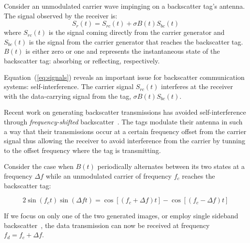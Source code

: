 
Consider an unmodulated carrier wave impinging on a backscatter tag's
antenna. The signal observed by the receiver is:
\begin{equation}
				S_r(t) = S_{rc}(t) + \sigma B(t)S_{bc}(t)
				\label{eq:signals}
\end{equation}
where $S_{rc}(t)$ is the signal coming directly from the carrier
generator and $S_{bc}(t)$ is the signal from the carrier generator that
reaches the backscatter tag. $B(t)$ is either zero or one and represents
the instantaneous state of the backscatter tag: absorbing or reflecting,
respectively.

Equation~(\ref{eq:signals}) reveals an important issue for backscatter
communication systems: self-interference. The carrier signal $S_{rc}(t)$
interferes at the receiver with the data-carrying signal from the tag,
$\sigma B(t)S_{bc}(t)$. 

Recent work on generating backscatter transmissions has avoided
self-interference through \textit{frequency-shifted}
backscatter~\cite{kellogg_passive_2016,wang_fm_2017}.
The tags modulate their antenna in such a way that their transmissions
occur at a certain frequency offset from the carrier signal thus
allowing the receiver to avoid interference from the carrier by tunning
to the offset frequency where the tag is transmitting.

Consider the case when $B(t)$ periodically
alternates between its two states at a frequency $\Delta f$ while an
unmodulated carrier of frequency $f_c$ reaches the backscatter tag:

\begin{equation}
    2\sin(f_c t) \sin(\Delta f t) = \cos[(f_c + \Delta f)t] - \cos[(f_c - \Delta f) t]
    \label{eq:mixing}
\end{equation}

If we focus on only one of the two generated images, or employ single
sideband backscatter~\cite{interscatter}, the data transmission can now
be received at frequency $f_d = f_c + \Delta f$.

